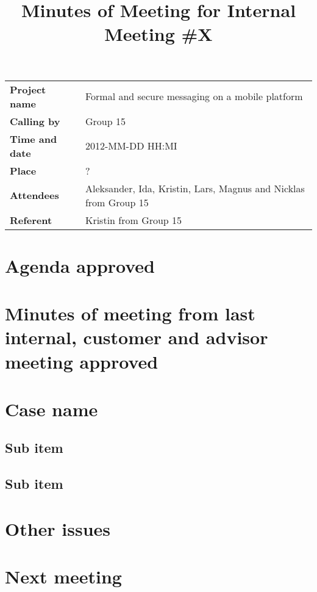 
\title{Minutes of Meeting for Internal Meeting \#X}
\maketitle
\begin{tabular}{>{\bfseries}l l}	
Project name&Formal and secure messaging on a mobile platform\\
Calling by&Group 15\\
Time and date&2012-MM-DD HH:MI\\
Place&?\\
Attendees&Aleksander, Ida, Kristin, Lars, Magnus and Nicklas from Group 15\\
Referent&Kristin from Group 15\\
\end{tabular}

\section{Agenda approved}
\section{Minutes of meeting from last internal, customer and advisor meeting approved}
\section{Case name}
\subsection{Sub item}
\subsection{Sub item}
\section{Other issues}
\section{Next meeting}
